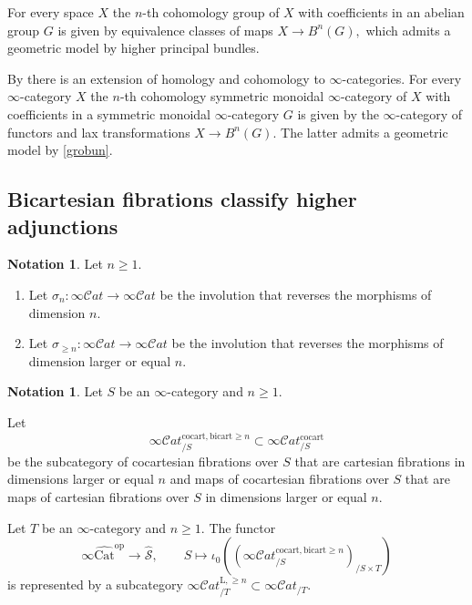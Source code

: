 \documentclass[10pt,oneside]{article}
\numberwithin{equation}{section} %
\numberwithin{figure}{section} %
\theoremstyle{plain}
\theoremstyle{definition}
\newtheorem{notation}[thm]{Notation}
\newcommand{\mS}{{\mathcal S}}
\newcommand{\op}{\mathrm{op}}
\newcommand{\Cat}{\mathrm{Cat}}
\newcommand{\cocart}{{\mathrm{cocart}}}
\newcommand{\bicart}{{\mathrm{bicart}}}
\newcommand{\scat}{\mathcal{C}\mathit{at}}
\begin{document}
\begin{remark}
For every space $X$ 
the $n$-th cohomology group of $X$ with coefficients in an abelian group $G$
is given by equivalence classes of maps $X \to B^n(G),$ which admits a geometric model by higher principal bundles.

By \cite{heine2025homology} there is an extension of homology and cohomology to $\infty$-categories.
For every $\infty$-category $X$ 
the $n$-th cohomology symmetric monoidal $\infty$-category of $X$ with coefficients in a symmetric monoidal $\infty$-category $G$
is given by the $\infty$-category of functors and lax transformations $X \to B^n(G).$
The latter admits a geometric model by \cref{grobun}.

    
\end{remark}

\subsection{Bicartesian fibrations classify higher adjunctions}

\begin{notation}Let $n \geq 1.$

\begin{enumerate}[\normalfont(1)]\setlength{\itemsep}{-2pt}

\item Let $\sigma_{n}: \infty\scat \to \infty\scat$ be the involution that reverses the morphisms of dimension $n.$

\item Let $\sigma_{\geq n}: \infty\scat \to \infty\scat$ be the involution that reverses the morphisms of dimension larger or equal $n.$

\end{enumerate}
    
\end{notation}

\begin{notation}Let $S$ be an $\infty$-category and $n \geq 1.$

Let $$\infty\scat^{\cocart, \bicart\geq n}_{/S} \subset \infty\scat^{\cocart}_{/S} $$
be the subcategory of cocartesian fibrations over $S$ 
that are cartesian fibrations in dimensions larger or equal $n$
and maps of cocartesian fibrations over $S$
that are maps of cartesian fibrations over $S$ in dimensions larger or equal $n$.

\end{notation}

\begin{theorem}\label{Grobica} Let $T$ be an $\infty$-category and $n \geq 1.$
The functor $$ \infty\widehat{\Cat}^\op \to \widehat{\mS}, \qquad S \mapsto \iota_0((\infty\scat^{\cocart, \bicart \geq n}_{/S})_{/S \times T}) $$ is represented by a subcategory $\infty\scat_{/T}^{\mathrm{L},\geq n} \subset \infty\scat_{/T} $.

\end{theorem}
\end{document}
